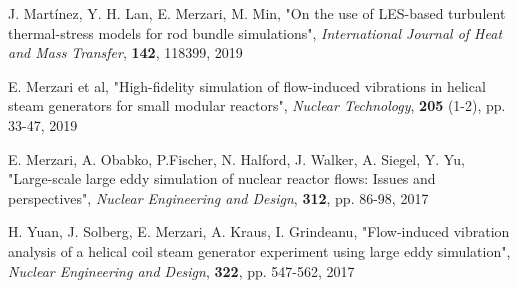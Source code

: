 \documentclass[11pt,letterpaper,english]{article}
\begin{document}
J. Martínez, Y. H. Lan, E. Merzari, M. Min, "On the use of LES-based turbulent thermal-stress models for rod bundle simulations", \textit{International Journal of Heat and Mass Transfer}, \textbf{142}, 118399, 2019

E. Merzari et al, "High-fidelity simulation of flow-induced vibrations in helical steam generators for small modular reactors", \textit{Nuclear Technology}, \textbf{205} (1-2), pp. 33-47, 2019

E. Merzari, A. Obabko, P.Fischer, N. Halford, J. Walker, A. Siegel, Y. Yu, "Large-scale large eddy simulation of nuclear reactor flows: Issues and perspectives", \textit{Nuclear Engineering and Design}, \textbf{312}, pp. 86-98, 2017

H. Yuan, J. Solberg, E. Merzari, A. Kraus, I. Grindeanu, "Flow-induced vibration analysis of a helical coil steam generator experiment using large eddy simulation", \textit{Nuclear Engineering and Design}, \textbf{322}, pp. 547-562, 2017



\end{document}
